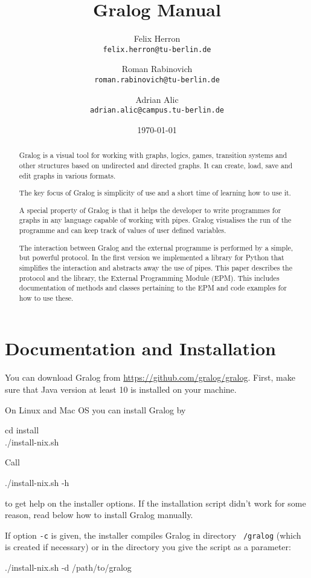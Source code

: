\documentclass{article}
\title{Gralog Manual}
\author{Felix Herron\\\texttt{felix.herron@tu-berlin.de}
  \and Roman Rabinovich\\ \texttt{roman.rabinovich@tu-berlin.de}
\and Adrian Alic\\ \texttt{adrian.alic@campus.tu-berlin.de}}
\date{\today}
\newcounter{example}
\begin{document}
\maketitle


\begin{abstract}
Gralog is a visual tool for working with graphs, logics, games,
transition systems and other structures based on undirected and
directed graphs. It can create, load, save and edit graphs in
various formats.

The key focus of Gralog is simplicity of use and a short time of
learning how to use it.

A special property of Gralog is that it helps the developer to write
programmes for graphs in any language capable of working with
pipes. Gralog visualises the run of the programme and can keep track
of values of user defined variables.

The interaction between Gralog and the external programme is
performed by a simple, but powerful protocol. In the first version
we implemented a library for Python that simplifies the interaction
and abstracts away the use of pipes. This paper describes the
protocol and the library, the External Programming Module (EPM). This
includes documentation of methods and classes pertaining to the
EPM and code examples for how to use these.
\end{abstract}

\section{Documentation and Installation}

You can download Gralog from \url{https://github.com/gralog/gralog}.
First, make sure that Java version at least 10 is installed on your
machine.

On Linux and Mac OS you can install Gralog by
\\\begin{tcolorbox}
  cd install\\
  ./install-nix.sh
\end{tcolorbox}

Call
\\\begin{tcolorbox}
  ./install-nix.sh -h
\end{tcolorbox}
to get help on the installer options. If the installation script
didn't work for some reason, read below how to install Gralog manually.

If option \texttt{-c} is given, the installer compiles Gralog in
directory \texttt{~/gralog} (which is created if necessary) or in the directory you give the script as a parameter:
\\\begin{tcolorbox}
  ./install-nix.sh -d /path/to/gralog
\end{tcolorbox}
\end{document}
